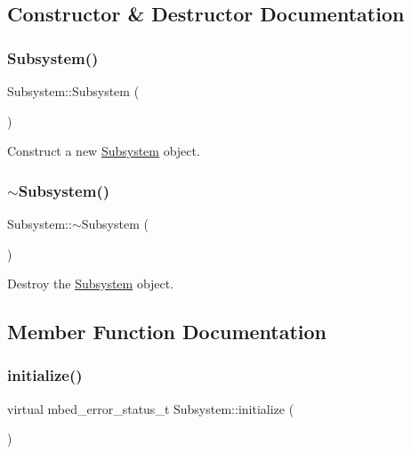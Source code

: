 \subsection{Constructor \& Destructor Documentation}
\mbox{\label{class_subsystem_abdec44abe9ddba76f65abb02f8f62992}} 
\subsubsection{\texorpdfstring{Subsystem()}{Subsystem()}}
{\footnotesize\ttfamily Subsystem\+::\+Subsystem (\begin{DoxyParamCaption}{ }\end{DoxyParamCaption})\hspace{0.3cm}{\ttfamily [inline]}}



Construct a new \mbox{\hyperlink{class_subsystem}{Subsystem}} object. 

\mbox{\label{class_subsystem_af6026d0c678986cf1626251bf38916fa}} 
\subsubsection{\texorpdfstring{$\sim$Subsystem()}{~Subsystem()}}
{\footnotesize\ttfamily Subsystem\+::$\sim$\+Subsystem (\begin{DoxyParamCaption}{ }\end{DoxyParamCaption})\hspace{0.3cm}{\ttfamily [inline]}}



Destroy the \mbox{\hyperlink{class_subsystem}{Subsystem}} object. 



\subsection{Member Function Documentation}
\mbox{\label{class_subsystem_afa43e7c1c8b49e514b944f517d4dc905}} 
\subsubsection{\texorpdfstring{initialize()}{initialize()}}
{\footnotesize\ttfamily virtual mbed\+\_\+error\+\_\+status\+\_\+t Subsystem\+::initialize (\begin{DoxyParamCaption}{ }\end{DoxyParamCaption})\hspace{0.3cm}{\ttfamily [pure virtual]}}



